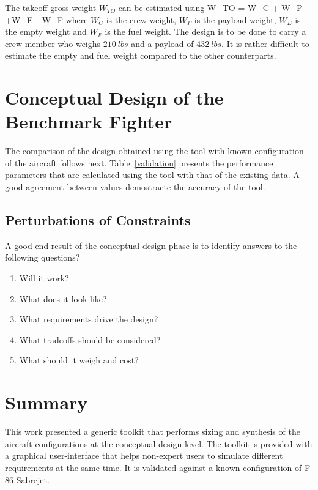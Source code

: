 \documentclass[pdftex,11pt,letter]{article}
\begin{document}
The  takeoff gross weight $W_{TO}$ can be estimated using
\beq\label{eq:takeoff_weight}
W_{TO} = W_C + W_P +W_E +W_F
\eeq
where $W_C$ is the crew weight, $W_P$ is the payload weight, $W_E$ is the empty weight and $W_F$ is the fuel weight. The design is to be done to carry a crew member who weighs $210~lbs$ and  a payload of $432~lbs$. It is rather difficult to estimate the empty and fuel weight compared to the other counterparts.


\section{Conceptual Design of the Benchmark Fighter}
The comparison of the design obtained using the tool with known configuration of the aircraft follows next. Table~\ref{validation} presents the performance parameters that are calculated using the tool with that of the existing data\cite{}. A good agreement between values demostracte the accuracy of the tool.

\subsection{Perturbations of Constraints}

A good end-result of the conceptual design phase is to identify answers to the following questions? 
\begin{enumerate}
\item Will it work?
\item What does it look like?
\item What requirements drive the design?
\item What tradeoffs should be considered?
\item What should it weigh and cost?
\end{enumerate}


\section{Summary}\label{conclusion}

This work presented a generic toolkit that performs sizing and synthesis of the aircraft configurations at the conceptual design level. The toolkit is provided with a graphical user-interface that helps non-expert users to simulate different requirements at the same time. It is validated against a known configuration of F-86 Sabrejet. 
\end{document}
